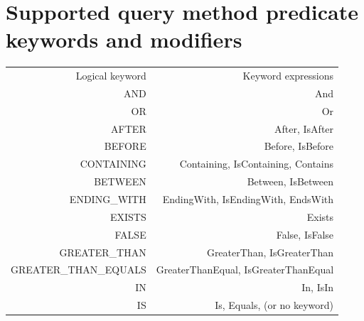 \documentclass{scrartcl}
\begin{document}
\section{Supported query method predicate keywords and modifiers}

    \begin{table}[ht]
    \begin{tabular}{ | r | r |}
    \hline
    Logical keyword& 	Keyword expressions \\

    AND&


    And\\

    OR&


    Or\\

    AFTER&


    After, IsAfter\\

    BEFORE&


    Before, IsBefore\\

    CONTAINING&


    Containing, IsContaining, Contains\\

    BETWEEN&


    Between, IsBetween\\

    ENDING\_WITH&


    EndingWith, IsEndingWith, EndsWith\\

    EXISTS&


    Exists\\

    FALSE&


    False, IsFalse\\

    GREATER\_THAN&


    GreaterThan, IsGreaterThan\\

    GREATER\_THAN\_EQUALS&


    GreaterThanEqual, IsGreaterThanEqual\\

    IN&


    In, IsIn\\

    IS&


    Is, Equals, (or no keyword)\\


\end{tabular}
\end{table}
\end{document}
